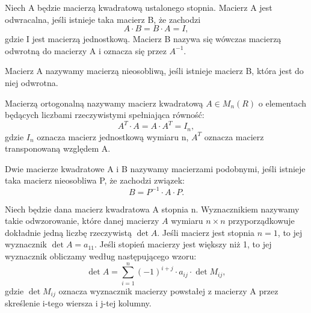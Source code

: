 \documentclass[10pt,a4paper]{report}
\begin{document}
\begin{definition}
Niech A będzie macierzą kwadratową ustalonego stopnia. Macierz A jest odwracalna, jeśli istnieje taka macierz B, że zachodzi
$$A\cdot B=B\cdot A=I, $$ 
gdzie I jest macierzą jednostkową. Macierz B nazywa się wówczas macierzą odwrotną do macierzy A i oznacza się przez  $A^{-1}.$
\end{definition}

\begin{definition}
Macierz A nazywamy macierzą nieosobliwą, jeśli istnieje macierz B, która jest do niej odwrotna.
\end{definition}  

\begin{definition}
Macierzą ortogonalną nazywamy macierz kwadratową $A\in M_{n}(R)$ o elementach będących liczbami rzeczywistymi spełniająca równość:
$$A^{T}\cdot A=A\cdot A^{T}=I_{n},$$ 
gdzie $I_{n}$ oznacza macierz jednostkową wymiaru n, $A^{T}$ oznacza macierz transponowaną względem A.
\end{definition}

\begin{definition}
Dwie macierze kwadratowe A i B nazywamy macierzami podobnymi, jeśli istnieje taka macierz nieosobliwa P, że zachodzi związek: 
$$ B=P^{-1}\cdot A\cdot P. $$
\end{definition}


%
%


\begin{definition}[??]
Niech będzie dana macierz kwadratowa A stopnia n. Wyznacznikiem nazywamy takie odwzorowanie, które danej macierzy $A$ wymiaru $n \times n$ przyporządkowuje dokładnie jedną liczbę rzeczywistą $\det A$. Jeśli macierz jest stopnia $n = 1$, to jej wyznacznik $\det A  = a_{11}$. 
Jeśli stopień macierzy jest większy niż 1, to jej wyznacznik obliczamy według następującego wzoru: 
$$
\det A = \sum_{i=1}^{n} (-1)^{i+j}\cdot a_{ij}\cdot \det M_{ij},
$$
gdzie $\det M_{ij}$ oznacza wyznacznik macierzy powstałej z macierzy A przez skreślenie i-tego wiersza i j-tej kolumny.
\end{definition}
\end{document}
